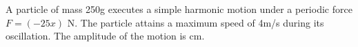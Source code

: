 \item A particle of mass 250g executes a simple harmonic motion under a periodic force \( F = (-25x) \) N. The particle attains a maximum speed of 4m/s during its oscillation. The amplitude of the motion is \underline{\hspace{2.5cm}} cm.